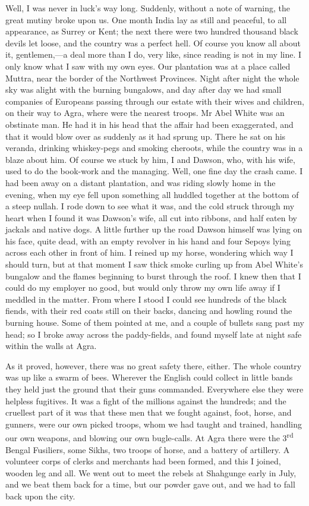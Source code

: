 Well, I was never in luck's way long. Suddenly, without a note of warning, the great mutiny broke upon us. One month India lay as still and peaceful, to all appearance, as Surrey or Kent; the next there were two hundred thousand black devils let loose, and the country was a perfect hell. Of course you know all about it, gentlemen,—a deal more than I do, very like, since reading is not in my line. I only know what I saw with my own eyes. Our plantation was at a place called Muttra, near the border of the Northwest Provinces. Night after night the whole sky was alight with the burning bungalows, and day after day we had small companies of Europeans passing through our estate with their wives and children, on their way to Agra, where were the nearest troops. Mr Abel White was an obstinate man. He had it in his head that the affair had been exaggerated, and that it would blow over as suddenly as it had sprung up. There he sat on his veranda, drinking whiskey-pegs and smoking cheroots, while the country was in a blaze about him. Of course we stuck by him, I and Dawson, who, with his wife, used to do the book-work and the managing. Well, one fine day the crash came. I had been away on a distant plantation, and was riding slowly home in the evening, when my eye fell upon something all huddled together at the bottom of a steep nullah. I rode down to see what it was, and the cold struck through my heart when I found it was Dawson's wife, all cut into ribbons, and half eaten by jackals and native dogs. A little further up the road Dawson himself was lying on his face, quite dead, with an empty revolver in his hand and four Sepoys lying across each other in front of him. I reined up my horse, wondering which way I should turn, but at that moment I saw thick smoke curling up from Abel White's bungalow and the flames beginning to burst through the roof. I knew then that I could do my employer no good, but would only throw my own life away if I meddled in the matter. From where I stood I could see hundreds of the black fiends, with their red coats still on their backs, dancing and howling round the burning house. Some of them pointed at me, and a couple of bullets sang past my head; so I broke away across the paddy-fields, and found myself late at night safe within the walls at Agra.

As it proved, however, there was no great safety there, either. The whole country was up like a swarm of bees. Wherever the English could collect in little bands they held just the ground that their guns commanded. Everywhere else they were helpless fugitives. It was a fight of the millions against the hundreds; and the cruellest part of it was that these men that we fought against, foot, horse, and gunners, were our own picked troops, whom we had taught and trained, handling our own weapons, and blowing our own bugle-calls. At Agra there were the 3\textsuperscript{rd} Bengal Fusiliers, some Sikhs, two troops of horse, and a battery of artillery. A volunteer corps of clerks and merchants had been formed, and this I joined, wooden leg and all. We went out to meet the rebels at Shahgunge early in July, and we beat them back for a time, but our powder gave out, and we had to fall back upon the city.


